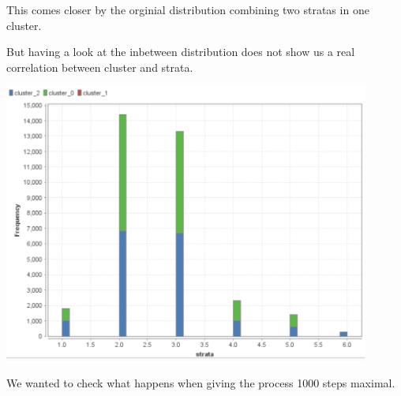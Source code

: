 This comes closer by the orginial distribution combining two stratas in one cluster.

But having a look at the inbetween distribution does not show us a real correlation between cluster and strata.

\includegraphics[width=0.9\textwidth]{vectorClustering3Cluster.PNG}

We wanted to check what happens when giving the process 1000 steps maximal. 
